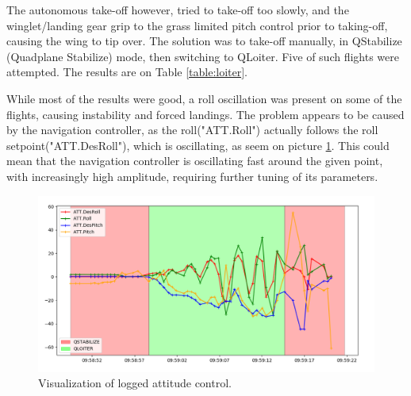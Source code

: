 The autonomous take-off however, tried to take-off too slowly, and the winglet/landing gear grip to the grass limited pitch control prior to taking-off, causing the wing to tip over. The solution was to take-off manually, in QStabilize (Quadplane Stabilize) mode, then switching to QLoiter. Five of such flights were attempted. The results are on Table \ref{table:loiter}.

While most of the results were good, a roll oscillation was present on some of the flights, causing instability and forced landings.
The problem appears to be caused by the navigation controller, as the roll("ATT.Roll") actually follows the roll setpoint("ATT.DesRoll"), which is oscillating, as seem on picture \ref{fig:rollOscillation}. This could mean that the navigation controller is oscillating fast around the given point, with increasingly high amplitude, requiring further tuning of its parameters. 

	\begin{figure}
\centering
  \includegraphics[width=0.9\linewidth]{figs/rolloscillation.png}
  \caption{Visualization of logged attitude control.}
  \label{fig:rollOscillation}
\end{figure}
	


